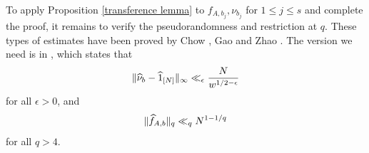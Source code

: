 \documentclass[11pt]{amsart}
\theoremstyle{plain} %
\theoremstyle{remark}
\numberwithin{equation}{section}
\DeclarePairedDelimiter\norm{\lVert}{\rVert}
\begin{document}
To apply Proposition \ref{transference lemma} to $f_{A,b_j},\nu_{b_j}$ for $1\leq j\leq s$ and complete the proof, it remains to verify the pseudorandomness and restriction at $q$. These types of estimates have been proved by Chow \cite{Chow}, Gao \cite{Gao} and Zhao \cite{zhao2025densitytheoremprimesquares}. The version we need is in \cite[Proposition 3.2, 3.3]{zhao2025densitytheoremprimesquares}, which states that
\begin{equation*}
    \norm{\widehat{\nu}_b-\widehat{1}_{[N]}}_{\infty}\ll_{\epsilon} \frac{N}{w^{1/2-\epsilon}}
\end{equation*}
for all $\epsilon>0$, and
\begin{equation*}
    \norm{\widehat{f}_{A,b}}_q\ll_q N^{1-1/q}
\end{equation*}
for all $q>4$.

\printbibliography %
\end{document}
